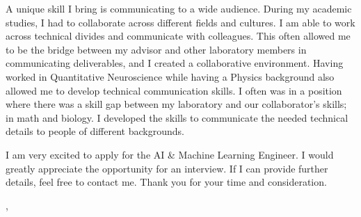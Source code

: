\documentclass[12pt]{letter}
\begin{document}
A unique skill I bring is communicating to a wide audience.
During my academic studies, I had to collaborate across different
fields and cultures.
I am able to work across technical divides and communicate with colleagues.
This often allowed me to be the bridge between my advisor and other
laboratory members in communicating deliverables,
and I created a collaborative environment.
Having worked in Quantitative Neuroscience while having a Physics
background also allowed me to develop technical communication skills.
I often was in a position where there was a skill gap between my
laboratory and our collaborator's skills; in math and biology.
I developed the skills to communicate the needed technical details to
people of different backgrounds.

I am very excited to apply for the AI \& Machine Learning Engineer.
I would greatly appreciate the opportunity for an interview.
If I can provide further details, feel free to contact me.
Thank you for your time and consideration.

\vspace{0.1in}
\vfill

\begin{flushright}
  \closer, \\
  \myname\\
  \mytitle
\end{flushright}
\end{document}
